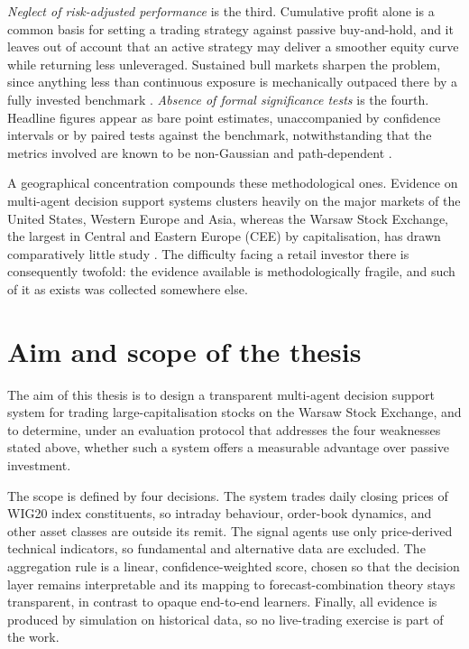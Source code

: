 \emph{Neglect of risk-adjusted performance} is the third. Cumulative profit alone is a common basis for setting a trading strategy against passive buy-and-hold, and it leaves out of account that an active strategy may deliver a smoother equity curve while returning less unleveraged. Sustained bull markets sharpen the problem, since anything less than continuous exposure is mechanically outpaced there by a fully invested benchmark \cite{dichtl2020}. \emph{Absence of formal significance tests} is the fourth. Headline figures appear as bare point estimates, unaccompanied by confidence intervals or by paired tests against the benchmark, notwithstanding that the metrics involved are known to be non-Gaussian and path-dependent \cite{politis1994,bailey2014}.

A geographical concentration compounds these methodological ones. Evidence on multi-agent decision support systems clusters heavily on the major markets of the United States, Western Europe and Asia, whereas the Warsaw Stock Exchange, the largest in Central and Eastern Europe (CEE) by capitalisation, has drawn comparatively little study \cite{czapkiewicz2018,kompa2009,gurgul2025}. The difficulty facing a retail investor there is consequently twofold: the evidence available is methodologically fragile, and such of it as exists was collected somewhere else.

\section{Aim and scope of the thesis}\label{sec:aim}

The aim of this thesis is to design a transparent multi-agent decision support system for trading large-capitalisation stocks on the Warsaw Stock Exchange, and to determine, under an evaluation protocol that addresses the four weaknesses stated above, whether such a system offers a measurable advantage over passive investment.

The scope is defined by four decisions. The system trades daily closing prices of WIG20 index constituents, so intraday behaviour, order-book dynamics, and other asset classes are outside its remit. The signal agents use only price-derived technical indicators, so fundamental and alternative data are excluded. The aggregation rule is a linear, confidence-weighted score, chosen so that the decision layer remains interpretable and its mapping to forecast-combination theory stays transparent, in contrast to opaque end-to-end learners. Finally, all evidence is produced by simulation on historical data, so no live-trading exercise is part of the work.

